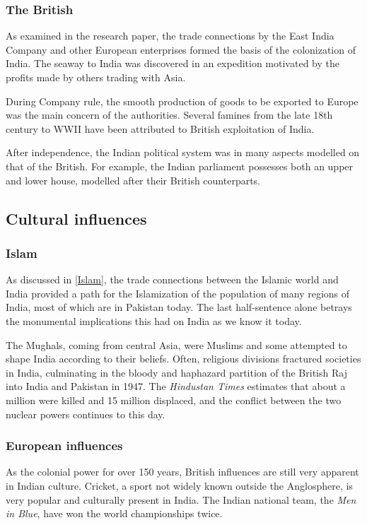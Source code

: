 \documentclass[11pt, a4paper, headings=standardclasses]{scrartcl}
\begin{document}
\subsubsection{The British}

As examined in the research paper, the trade connections by the East India Company and other European enterprises formed the basis of the colonization of India. The seaway to India was discovered in an expedition motivated by the profits made by others trading with Asia.

During Company rule, the smooth production of goods to be exported to Europe was the main concern of the authorities. Several famines from the late 18th century to WWII have been attributed to British exploitation of India.\autocite{td}

After independence, the Indian political system was in many aspects modelled on that of the British. For example, the Indian parliament possesses both an upper and lower house, modelled after their British counterparts.

\subsection{Cultural influences}
\subsubsection{Islam}
As discussed in \ref{Islam}, the trade connections between the Islamic world and India provided a path for the Islamization of the population of many regions of India, most of which are in Pakistan today. The last half-sentence alone betrays the monumental implications this had on India as we know it today.

The Mughals, coming from central Asia, were Muslims and some attempted to shape India according to their beliefs. Often, religious divisions fractured societies in India, culminating in the bloody and haphazard partition of the British Raj into India and Pakistan in 1947. The \textit{Hindustan Times} estimates that about a million were killed and 15 million displaced, and the conflict between the two nuclear powers continues to this day.\autocite[Chapter VI]{guha, partition}

\subsubsection{European influences}

As the colonial power for over 150 years, British influences are still very apparent in Indian culture. Cricket, a sport not widely known outside the Anglosphere, is very popular and culturally present in India.\autocite{cricket} The Indian national team, the \textit{Men in Blue}, have won the world championships twice.\autocite{bbc}
\end{document}
